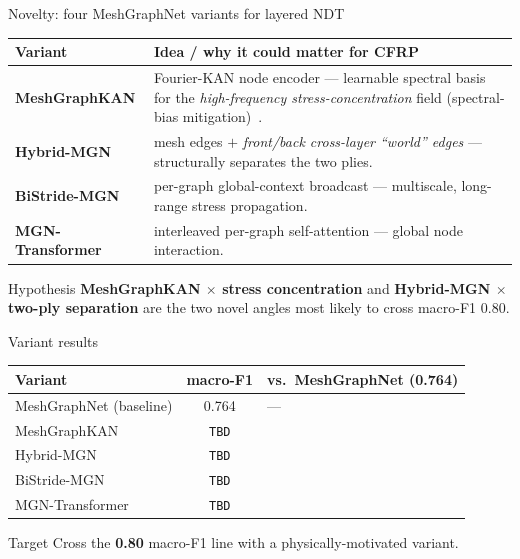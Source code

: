 \documentclass[aspectratio=169,10pt]{beamer}
\begin{document}
\begin{frame}{Novelty: four MeshGraphNet variants for layered NDT}
\begin{tabular}{p{2.7cm} p{7.5cm}}
\toprule
Variant & Idea / why it could matter for CFRP \\
\midrule
\textbf{MeshGraphKAN} & Fourier-KAN node encoder — learnable spectral basis for the
  \emph{high-frequency stress-concentration} field (spectral-bias mitigation)~\cite{tancik2020fourier}. \\[2pt]
\textbf{Hybrid-MGN} & mesh edges $+$ \emph{front/back cross-layer ``world'' edges} —
  structurally separates the two plies. \\[2pt]
\textbf{BiStride-MGN} & per-graph global-context broadcast — multiscale, long-range
  stress propagation. \\[2pt]
\textbf{MGN-Transformer} & interleaved per-graph self-attention — global node interaction. \\
\bottomrule
\end{tabular}
\vspace{0.5em}
\begin{alertblock}{Hypothesis}
\textbf{MeshGraphKAN $\times$ stress concentration} and
\textbf{Hybrid-MGN $\times$ two-ply separation} are the two novel angles most
likely to cross macro-F1 $0.80$.
\end{alertblock}
\end{frame}

\begin{frame}{Variant results }
\centering
\begin{tabular}{lcl}
\toprule
Variant & macro-F1 & vs.\ MeshGraphNet (0.764) \\
\midrule
MeshGraphNet (baseline) & 0.764 & --- \\
MeshGraphKAN     & \texttt{TBD} & \\
Hybrid-MGN       & \texttt{TBD} & \\
BiStride-MGN     & \texttt{TBD} & \\
MGN-Transformer  & \texttt{TBD} & \\
\bottomrule
\end{tabular}
\vspace{0.7em}

\begin{block}{Target}
Cross the \textbf{0.80} macro-F1 line with a physically-motivated variant.
\end{block}
\end{frame}
\end{document}
